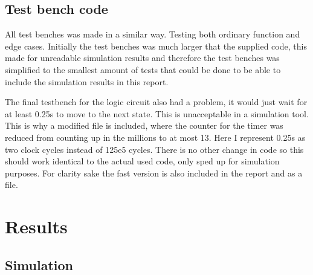 \documentclass{article}
\begin{document}
\subsection{Test bench code}
All test benches was made in a similar way. Testing both ordinary function and edge cases. Initially the test benches was much larger that the supplied code, this made for unreadable simulation results and therefore the test benches was simplified to the smallest amount of tests that could be done to be able to include the simulation results in this report.\par
The final testbench for the logic circuit also had a problem, it would just wait for at least 0.25s to move to the next state. This is unacceptable in a simulation tool. This is why a modified file is included, where the counter for the timer was reduced from counting up in the millions to at most 13. Here I represent 0.25s as two clock cycles instead of 125e5 cycles. There is no other change in code so this should work identical to the actual used code, only sped up for simulation purposes. For clarity sake the fast version is also included in the report and as a file.
\clearpage
{}


\section{Results}

\subsection{Simulation}
\end{document}
